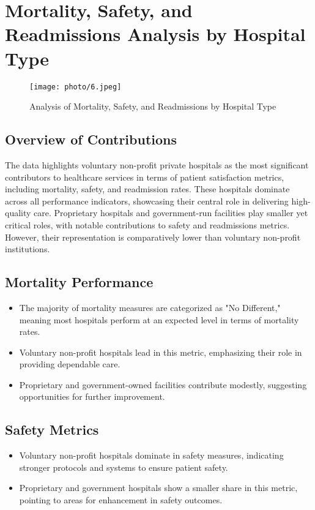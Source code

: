\section{Mortality, Safety, and Readmissions Analysis by Hospital Type}

\begin{figure}[ht]
    \centering
    \texttt{[image: photo/6.jpeg]} %
    \caption{Analysis of Mortality, Safety, and Readmissions by Hospital Type}
    \label{fig:metrics_by_hospital_type}
\end{figure}

\subsection{Overview of Contributions}
The data highlights voluntary non-profit private hospitals as the most significant contributors to healthcare services in terms of patient satisfaction metrics, including mortality, safety, and readmission rates. These hospitals dominate across all performance indicators, showcasing their central role in delivering high-quality care. Proprietary hospitals and government-run facilities play smaller yet critical roles, with notable contributions to safety and readmissions metrics. However, their representation is comparatively lower than voluntary non-profit institutions.

\subsection{Mortality Performance}
\begin{itemize}
    \item The majority of mortality measures are categorized as "No Different," meaning most hospitals perform at an expected level in terms of mortality rates.
    \item Voluntary non-profit hospitals lead in this metric, emphasizing their role in providing dependable care.
    \item Proprietary and government-owned facilities contribute modestly, suggesting opportunities for further improvement.
\end{itemize}

\subsection{Safety Metrics}
\begin{itemize}
    \item Voluntary non-profit hospitals dominate in safety measures, indicating stronger protocols and systems to ensure patient safety.
    \item Proprietary and government hospitals show a smaller share in this metric, pointing to areas for enhancement in safety outcomes.
\end{itemize}

